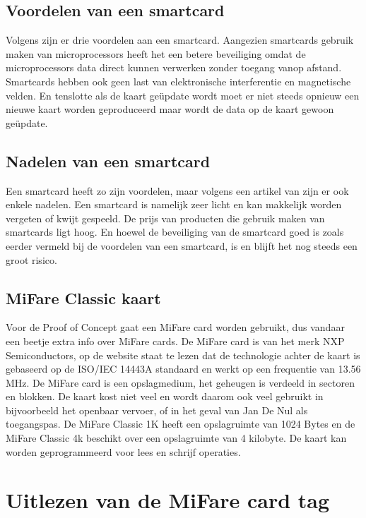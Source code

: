 \subsection{Voordelen van een smartcard}
Volgens \textcite{SwatiTawdeSmartCard} zijn er drie voordelen aan een smartcard. Aangezien smartcards gebruik maken van microprocessors heeft het een betere beveiliging omdat de microprocessors data direct kunnen verwerken zonder toegang vanop afstand. Smartcards hebben ook geen last van elektronische interferentie en magnetische velden. En tenslotte als de kaart geüpdate wordt moet er niet steeds opnieuw een nieuwe kaart worden geproduceerd maar wordt de data op de kaart gewoon geüpdate.

\subsection{Nadelen van een smartcard}
Een smartcard heeft zo zijn voordelen, maar volgens een artikel van \textcite{SageSmartCard} zijn er ook enkele nadelen. Een smartcard is namelijk zeer licht en kan makkelijk worden vergeten of kwijt gespeeld. De prijs van producten die gebruik maken van smartcards ligt hoog. En hoewel de beveiliging van de smartcard goed is zoals eerder vermeld bij de voordelen van een smartcard, is en blijft het nog steeds een groot risico.

\subsection{MiFare Classic kaart}
Voor de Proof of Concept gaat een MiFare card worden gebruikt, dus vandaar een beetje extra info over MiFare cards.
De MiFare card is van het merk NXP Semiconductors, op de \textcite{MiFareSmartCard} website staat te lezen dat de technologie achter de kaart is gebaseerd op de ISO/IEC 14443A standaard en werkt op een frequentie van 13.56 MHz. De MiFare card is een opslagmedium, het geheugen is verdeeld in sectoren en blokken. De kaart kost niet veel en wordt daarom ook veel gebruikt in bijvoorbeeld het openbaar vervoer, of in het geval van Jan De Nul als toegangspas.
De MiFare Classic 1K heeft een opslagruimte van 1024 Bytes en de MiFare Classic 4k beschikt over een opslagruimte van 4 kilobyte. De kaart kan worden geprogrammeerd voor lees en schrijf operaties.




\section{Uitlezen van de MiFare card tag}
